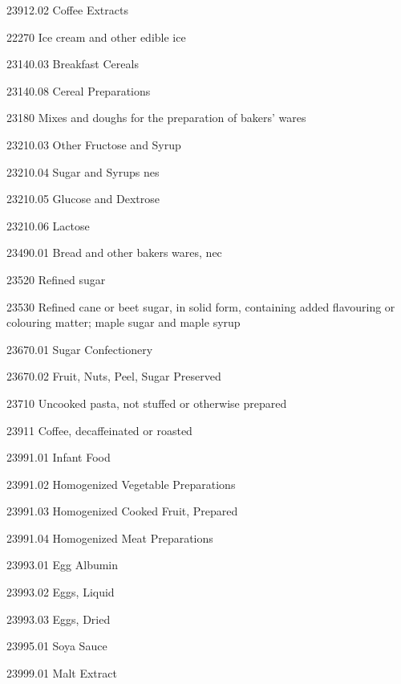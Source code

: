 \documentclass[nojss]{jss}
\begin{document}
\begin{appendices}
\begin{Schunk}
\begin{Soutput}
 23912.02          Coffee Extracts         

  22270     Ice cream and other edible ice 

 23140.03         Breakfast Cereals        

 23140.08        Cereal Preparations       

  23180        Mixes and doughs for the    
             preparation of bakers' wares  

 23210.03      Other Fructose and Syrup    

 23210.04        Sugar and Syrups nes      

 23210.05        Glucose and Dextrose      

 23210.06              Lactose             

 23490.01   Bread and other bakers wares,  
                         nec               

  23520             Refined sugar          

  23530     Refined cane or beet sugar, in 
             solid form, containing added  
               flavouring or colouring     
            matter; maple sugar and maple  
                        syrup              

 23670.01        Sugar Confectionery       

 23670.02      Fruit, Nuts, Peel, Sugar    
                      Preserved            

  23710     Uncooked pasta, not stuffed or 
                  otherwise prepared       

  23911        Coffee, decaffeinated or    
                       roasted             

 23991.01            Infant Food           

 23991.02       Homogenized Vegetable      
                     Preparations          

 23991.03     Homogenized Cooked Fruit,    
                       Prepared            

 23991.04   Homogenized Meat Preparations  

 23993.01            Egg Albumin           

 23993.02            Eggs, Liquid          

 23993.03            Eggs, Dried           

 23995.01             Soya Sauce           

 23999.01            Malt Extract          


\end{Soutput}
\end{Schunk}
\end{appendices}
\end{document}
